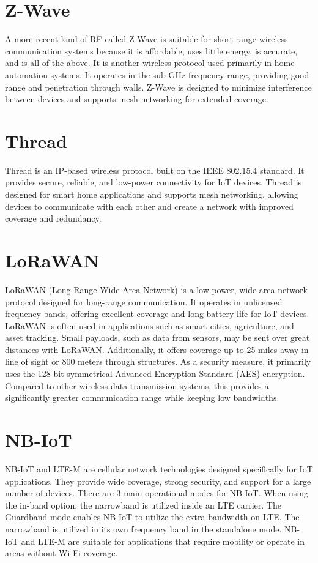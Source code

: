 \section{Z-Wave}
A more recent kind of RF called Z-Wave is suitable for short-range wireless communication systems because it is affordable, uses little energy, is accurate, and is all of the above. It is another wireless protocol used primarily in home automation systems. It operates in the sub-GHz frequency range, providing good range and penetration through walls. Z-Wave is designed to minimize interference between devices and supports mesh networking for extended coverage.
\section{Thread}
Thread is an IP-based wireless protocol built on the IEEE 802.15.4 standard. It provides secure, reliable, and low-power connectivity for IoT devices. Thread is designed for smart home applications and supports mesh networking, allowing devices to communicate with each other and create a network with improved coverage and redundancy.
\section{LoRaWAN}
 LoRaWAN (Long Range Wide Area Network) is a low-power, wide-area network protocol designed for long-range communication. It operates in unlicensed frequency bands, offering excellent coverage and long battery life for IoT devices. LoRaWAN is often used in applications such as smart cities, agriculture, and asset tracking. Small payloads, such as data from sensors, may be sent over great distances with LoRaWAN. Additionally, it offers coverage up to 25 miles away in line of sight or 800 meters through structures. As a security measure, it primarily uses the 128-bit symmetrical Advanced Encryption Standard (AES) encryption. Compared to other wireless data transmission systems, this provides a significantly greater communication range while keeping low bandwidths.

\section{NB-IoT}
 NB-IoT and LTE-M are cellular network technologies designed specifically for IoT applications. They provide wide coverage, strong security, and support for a large number of devices. There are 3 main operational modes for NB-IoT. When using the in-band option, the narrowband is utilized inside an LTE carrier. The Guardband mode enables NB-IoT to utilize the extra bandwidth on LTE. The narrowband is utilized in its own frequency band in the standalone mode. NB-IoT and LTE-M are suitable for applications that require mobility or operate in areas without Wi-Fi coverage.
